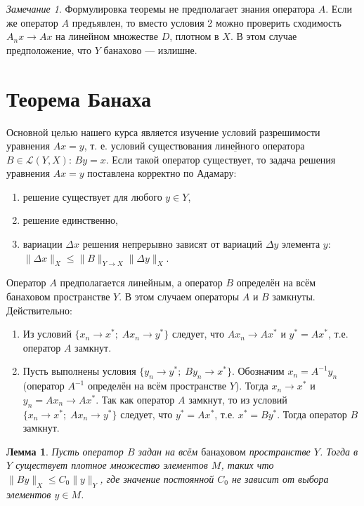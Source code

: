\documentclass[12pt,a4paper,titlepage,oneside]{book}
\theoremstyle{definition}
\theoremstyle{plain}
\theoremstyle{break}
\theoremstyle{remark}
\newtheorem*{remark}{Замечание}
\theoremstyle{remark}
\theoremstyle{remark}
\theoremstyle{remark}
\theoremstyle{plain}
\newtheorem*{lemma}{Лемма}
\theoremstyle{plain}
\begin{document}
\begin{remark}
Формулировка теоремы не предполагает знания оператора $A$. Если же оператор $A$ предъявлен, то вместо условия 2 можно проверить сходимость $A_n x\to A x$ на линейном множестве $D$, плотном в $X$. В этом случае предположение, что $Y$ банахово --- излишне.
\end{remark}

\section{Теорема Банаха}
Основной целью нашего курса является изучение условий разрешимости уравнения $Ax=y$, т. е. условий существования $\underbar {линейного}$ оператора $B\in \mathcal{L}(Y, X)$: $By=x$. Если такой оператор существует, то задача решения уравнения $Ax=y$ поставлена корректно по Адамару:
\begin{enumerate}
	\item решение существует для любого $y \in Y$,
	\item решение единственно,
	\item вариации $\Delta x$ решения непрерывно зависят от вариаций $\Delta y$ элемента $y$: $\lVert \Delta x\rVert_X \leqslant \lVert B\rVert_{Y\to X}\lVert \Delta y\rVert_X$.
\end{enumerate}
Оператор $A$ предполагается линейным, а оператор $B$ определён на всём банаховом пространстве $Y$. В этом случаем операторы $A$ и $B$ замкнуты. Действительно:
\begin{enumerate}

	\item Из условий $\lbrace x_n \to x^{*}; \; Ax_n \to y^{*} \rbrace$ следует, что $Ax_n \to Ax^{*}$ и $y^{*}=Ax^{*}$, т.е. оператор $A$ замкнут.

	\item Пусть выполнены условия $\lbrace y_n \to y^{*}; \; By_n \to x^{*} \rbrace$. Обозначим $x_n=A^{-1}y_n$ (оператор $A^{-1}$ определён на всём пространстве $Y$). Тогда $x_n \to x^{*}$ и $y_n=Ax_n \to Ax^{*}$. Так как оператор $A$ замкнут, то из условий $\lbrace x_n \to x^{*}; \; Ax_n \to y^{*} \rbrace$ следует, что $y^{*}=Ax^{*}$, т.е. $x^{*}=By^{*}$. Тогда оператор $B$ замкнут.
	
\end{enumerate}
	
\begin{lemma}
Пусть оператор $B$ задан на всём $\underbar {банаховом}$ пространстве $Y$. Тогда в $Y$ существует плотное множество элементов $M$, таких что $\lVert By\rVert_X \leqslant C_0\lVert y\rVert_Y $, где значение постоянной $C_0$ не зависит от выбора элементов $y \in M$.
\end{lemma}
\end{document}

